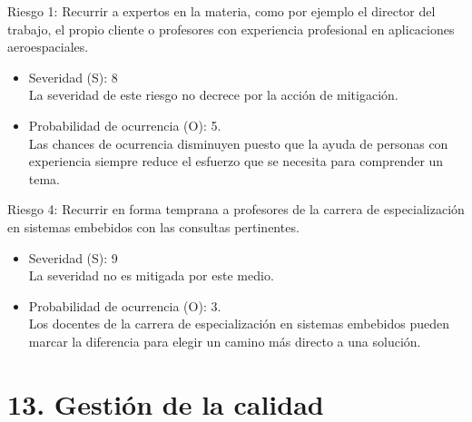 \documentclass[11pt]{charter}
\begin{document}
Riesgo 1: Recurrir a expertos en la materia, como por ejemplo el director del trabajo, el propio cliente o profesores con experiencia profesional en aplicaciones aeroespaciales.
\begin{itemize}
  \item Severidad (S): 8 \\
La severidad de este riesgo no decrece por la acción de mitigación. 
  \item Probabilidad de ocurrencia (O): 5. \\
Las chances de ocurrencia disminuyen puesto que la ayuda de personas con experiencia siempre reduce el esfuerzo que se necesita para comprender un tema.
\end{itemize}

Riesgo 4: Recurrir en forma temprana a profesores de la carrera de especialización en sistemas embebidos con las consultas pertinentes.
\begin{itemize}
  \item Severidad (S): 9 \\
La severidad no es mitigada por este medio.
  \item Probabilidad de ocurrencia (O): 3. \\
Los docentes de la carrera de especialización en sistemas embebidos pueden marcar la diferencia para elegir un camino más directo a una solución.
\end{itemize}

\section{13. Gestión de la calidad}
\label{sec:calidad}
\end{document}
